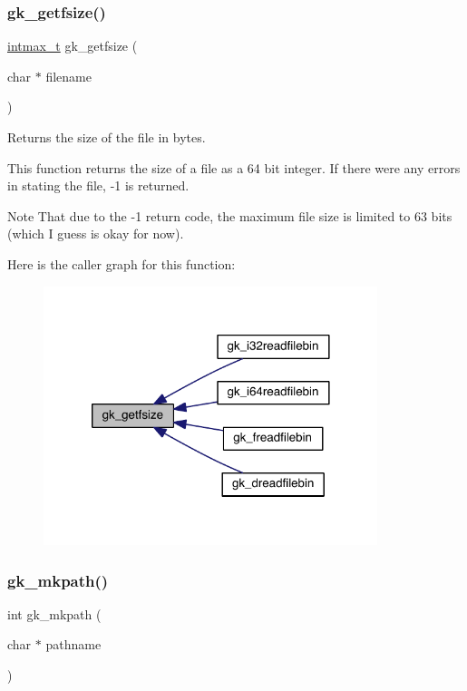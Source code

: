 \subsubsection{\texorpdfstring{gk\+\_\+getfsize()}{gk\_getfsize()}}
{\footnotesize\ttfamily \hyperlink{a00119_a036cd61bb4b30bb510b9538af4cebd1d}{intmax\+\_\+t} gk\+\_\+getfsize (\begin{DoxyParamCaption}\item[{char $\ast$}]{filename }\end{DoxyParamCaption})}



Returns the size of the file in bytes. 

This function returns the size of a file as a 64 bit integer. If there were any errors in stat\textquotesingle{}ing the file, -\/1 is returned. \begin{DoxyNote}{Note}
That due to the -\/1 return code, the maximum file size is limited to 63 bits (which I guess is okay for now). 
\end{DoxyNote}
Here is the caller graph for this function\+:\nopagebreak
\begin{figure}[H]
\begin{center}
\leavevmode
\includegraphics[width=276pt]{a00035_ab8e9c3fc4ed1161501b51e445afde0e5_icgraph}
\end{center}
\end{figure}
\mbox{\label{a00035_ab7c5c98647a9e3366fbe03a3a12f1f80}} 
\subsubsection{\texorpdfstring{gk\+\_\+mkpath()}{gk\_mkpath()}}
{\footnotesize\ttfamily int gk\+\_\+mkpath (\begin{DoxyParamCaption}\item[{char $\ast$}]{pathname }\end{DoxyParamCaption})}

